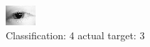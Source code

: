 \begin{figure}[h!]
\begin{center}
\includegraphics[width=0.60\columnwidth]{figures/ID88_class_4_target_3.png}
\end{center}
\caption{ Classification: 4 actual target: 3}
\label{fig:ID88_class_4_target_3}
\end{figure}
